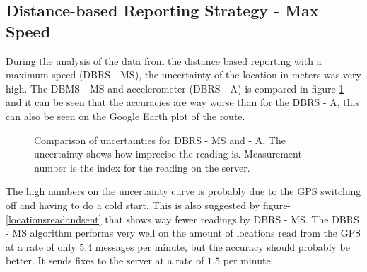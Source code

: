 \subsection{Distance-based Reporting Strategy - Max Speed}
During the analysis of the data from the distance based reporting with a maximum speed (DBRS - MS), the uncertainty of the location in meters was very high. The DBMS - MS and accelerometer (DBRS - A) is compared in figure-\ref{maxspeedaccelerometeraccuracy} and it can be seen that the accuracies are way worse than for the DBRS - A, this can also be seen on the Google Earth plot of the route.

\begin{figure}[h]

\caption{Comparison of uncertainties for DBRS - MS and - A. The uncertainty shows how imprecise the reading is. Measurement number is the index for the reading on the server.}
\label{maxspeedaccelerometeraccuracy}
\end{figure}

The high numbers on the uncertainty curve is probably due to the GPS switching off and having to do a cold start. This is also suggested by figure-\ref{locationsreadandsent} that shows way fewer readings by DBRS - MS. The DBRS - MS algorithm performs very well on the amount of locations read from the GPS at a rate of only $5.4$ messages per minute, but the accuracy should probably be better. It sends fixes to the server at a rate of $1.5$ per minute.